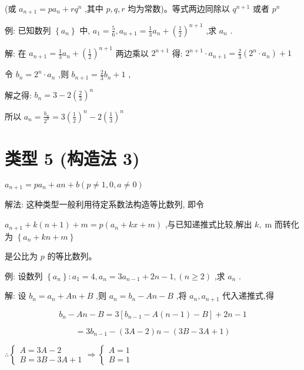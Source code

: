 \documentclass[10pt,cn]{elegantbook}
\begin{document}
(或 \({a}_{n + 1} = p{a}_{n} + r{q}^{n}\) ,其中 \(p,q,r\) 均为常数)。等式两边同除以 \({q}^{n + 1}\) 或者 \({p}^{n}\)

例: 已知数列 \(\left\{ {a}_{n}\right\}\) 中, \({a}_{1} = \frac{5}{6},{a}_{n + 1} = \frac{1}{3}{a}_{n} + {\left( \frac{1}{2}\right) }^{n + 1}\) ,求 \({a}_{n}\) .

解: 在 \({a}_{n + 1} = \frac{1}{3}{a}_{n} + {\left( \frac{1}{2}\right) }^{n + 1}\) 两边乘以 \({2}^{n + 1}\) 得: \({2}^{n + 1} \cdot {a}_{n + 1} = \frac{2}{3}\left( {{2}^{n} \cdot {a}_{n}}\right) + 1\)

令 \({b}_{n} = {2}^{n} \cdot {a}_{n}\) ,则 \({b}_{n + 1} = \frac{2}{3}{b}_{n} + 1\) ,

解之得: \({b}_{n} = 3 - 2{\left( \frac{2}{3}\right) }^{n}\)

所以 \({a}_{n} = \frac{{b}_{n}}{{2}^{n}} = 3{\left( \frac{1}{2}\right) }^{n} - 2{\left( \frac{1}{3}\right) }^{n}\)

\section{类型 5 (构造法 3)} \({a}_{n + 1} = p{a}_{n} + {an} + b\left( {p \neq 1,0,a \neq 0}\right)\)

解法: 这种类型一般利用待定系数法构造等比数列, 即令

\({a}_{n + 1} + k\left( {n + 1}\right) + m = p\left( {{a}_{n} + {kx} + m}\right)\) ,与已知递推式比较,解出 \(k,\mathrm{\;m}\) 而转化为 \(\left\{ {{a}_{n} + {kn} + m}\right\}\)

是公比为 \(p\) 的等比数列。

例: 设数列 \(\left\{ {a}_{n}\right\} : {a}_{1} = 4,{a}_{n} = 3{a}_{n - 1} + {2n} - 1,\left( {n \geq 2}\right)\) ,求 \({a}_{n}\) .

解: 设 \({b}_{n} = {a}_{n} + {An} + B\) ,则 \({a}_{n} = {b}_{n} - {An} - B\) ,将 \({a}_{n},{a}_{n + 1}\) 代入递推式,得

\[
{b}_{n} - {An} - B = 3\left\lbrack {{b}_{n - 1} - A\left( {n - 1}\right) - B}\right\rbrack + {2n} - 1
\]

\[
= 3{b}_{n - 1} - \left( {{3A} - 2}\right) n - \left( {{3B} - {3A} + 1}\right)
\]

\(\therefore \left\{ {\begin{array}{l} A = {3A} - 2 \\ B = {3B} - {3A} + 1 \end{array} \Rightarrow \left\{ \begin{array}{l} A = 1 \\ B = 1 \end{array}\right. }\right.\)
\end{document}
